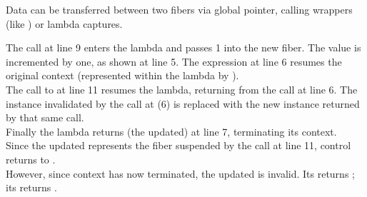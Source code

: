 
Data can be transferred between two fibers via global pointer, calling
wrappers (like ) or lambda captures.

The \resume call at line 9 enters the lambda and passes 1 into the
new fiber. The value is incremented by one, as shown at line 5. The expression
 at line 6 resumes the original context (represented
within the lambda by ).\\
The call to  at line 11 resumes the lambda, returning from
the  call at line 6. The \fiber instance 
invalidated by the \resume call at (6) is replaced with the new instance
returned by that same \resume call.\\
Finally the lambda returns (the updated)  at line 7, terminating its
context.\\

Since the updated  represents the fiber suspended by the call at
line 11, control returns to \main.\\

However, since context  has now terminated, the updated 
is invalid. Its \opbool returns ; its  returns
.\\

